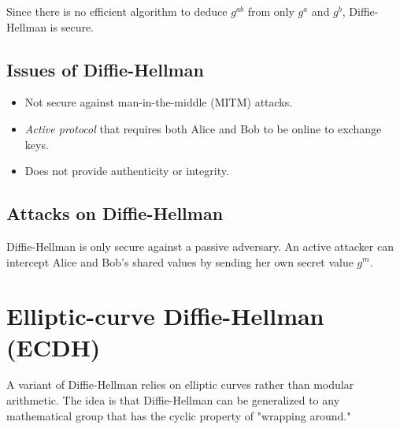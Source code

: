 \medskip

Since there is no efficient algorithm to deduce $g^{ab}$ from only $g^a$ and $g^b$, Diffie-Hellman is secure.

\subsection{Issues of Diffie-Hellman}
\begin{itemize}
    \item Not secure against man-in-the-middle (MITM) attacks.
    \item \emph{Active protocol} that requires both Alice and Bob to be online to exchange keys.
    \item Does not provide authenticity or integrity.
\end{itemize}

\subsection{Attacks on Diffie-Hellman}
Diffie-Hellman is only secure against a passive adversary. An active attacker can intercept Alice and Bob's shared values by sending her own secret value $g^m$.

\section{Elliptic-curve Diffie-Hellman (ECDH)}
A variant of Diffie-Hellman relies on elliptic curves rather than modular arithmetic. The idea is that Diffie-Hellman can be generalized to any mathematical group that has the cyclic property of "wrapping around."